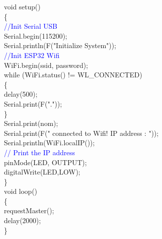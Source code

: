 \documentclass[12pt,a4paper]{article}
\begin{document}
void setup()\\
 \{\\
 \textcolor{blue}{//Init Serial USB}\\
 Serial.begin(115200);\\
 Serial.println(F("Initialize System"));\\
 \textcolor{blue}{//Init ESP32 Wifi}\\
 WiFi.begin(ssid, password);\\
while (WiFi.status() != WL\_CONNECTED)\\ 
\{\\
   delay(500);\\
   Serial.print(F("."));\\
 \}\\
 Serial.print(nom);\\
 Serial.print(F(" connected to Wifi! IP address : "));\\
 Serial.println(WiFi.localIP());\\ \textcolor{blue}{// Print the IP address}\\
 pinMode(LED, OUTPUT);\\
 digitalWrite(LED,LOW);\\
\}\\[15pt]

void loop() \\
\{\\
   requestMaster();\\
   delay(2000);\\
\}\\[15pt]
\end{document}
